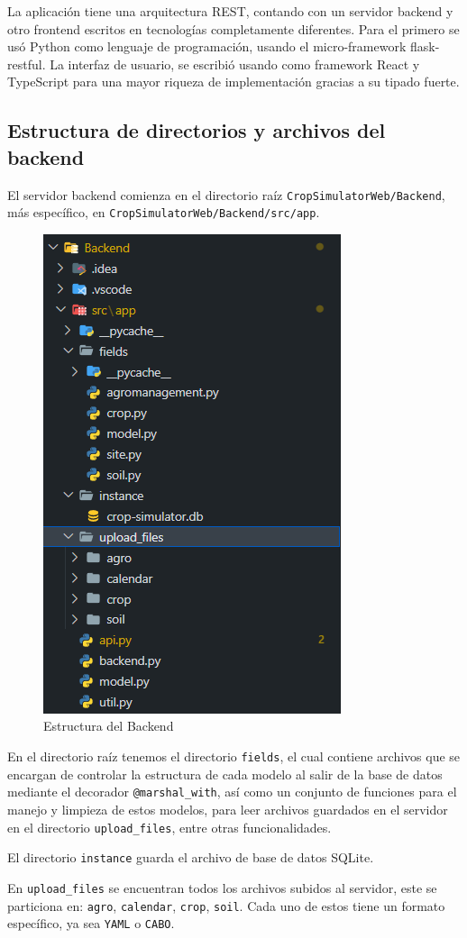 La aplicación tiene una arquitectura REST, contando con un servidor backend y otro frontend escritos en tecnologías completamente diferentes. Para el primero se usó Python como lenguaje de programación, usando el micro-framework flask-restful. La interfaz de usuario, se escribió usando como framework React y TypeScript para una mayor riqueza de implementación gracias a su tipado fuerte.\\

\subsection{Estructura de directorios y archivos del backend}
El servidor backend comienza en el directorio raíz \lstinline|CropSimulatorWeb/Backend|, más específico, en \lstinline|CropSimulatorWeb/Backend/src/app|.

\begin{figure}[!h]
	\centering
	\includegraphics[width=0.4\linewidth]{Images/back-structure}
	\caption{Estructura del Backend}
	\label{fig:back-structure}
\end{figure}

En el directorio raíz tenemos el directorio \lstinline|fields|, el cual contiene archivos que se encargan de controlar la estructura de cada modelo al salir de la base de datos mediante el decorador \lstinline|@marshal_with|, así como un conjunto de funciones para el manejo y limpieza de estos modelos, para leer archivos guardados en el servidor en el directorio \lstinline|upload_files|, entre otras funcionalidades.

El directorio \lstinline|instance| guarda el archivo de base de datos SQLite.

En \lstinline|upload_files| se encuentran todos los archivos subidos al servidor, este se particiona en: \lstinline|agro|, \lstinline|calendar|, \lstinline|crop|, \lstinline|soil|. Cada uno de estos tiene un formato específico, ya sea \lstinline|YAML| o \lstinline|CABO|.

